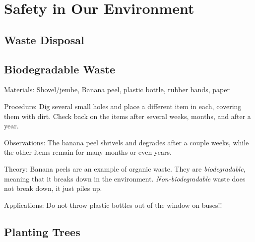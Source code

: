 \section{Safety in Our Environment} 

\begin{multicols}{2}


\section*{Waste Disposal} 


\subsection{Biodegradable Waste}  %


\begin{description*}
\item[Materials:]{Shovel/jembe, Banana peel, plastic bottle, rubber bands, paper}
\item[Procedure:]{Dig several small holes and place a different item in each, covering them with dirt. Check back on the items after several weeks, months, and after a year.}
\item[Observations:]{The banana peel shrivels and degrades after a couple weeks, while the other items remain for many months or even years.}
\item[Theory:]{Banana peels are an example of organic waste. They are \emph{biodegradable}}, meaning that it breaks down in the environment. \emph{Non-biodegradable} waste does not break down, it just piles up.
\item[Applications:]{Do not throw plastic bottles out of the window on buses!!}
\end{description*}

\subsection{Planting Trees}


\end{multicols}
